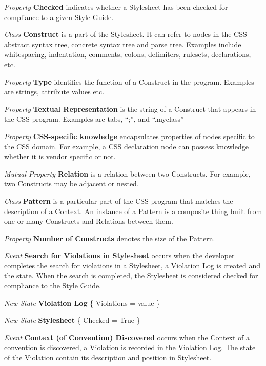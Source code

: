 \documentclass[parskip=full]{uvamscse}
\begin{document}
\begin{description}
\textit{Property} \textbf{Checked} indicates whether a Stylesheet has been checked for compliance to a given Style Guide. 


\item\textit{Class} \textbf{Construct} is a part of the Stylesheet. It can refer to nodes in the CSS abstract syntax tree, concrete syntax tree and parse tree. Examples include whitespacing, indentation, comments, colons, delimiters, rulesets, declarations, etc.

\textit{Property} \textbf{Type} identifies the function of a Construct in the program. Examples are strings, attribute values etc.

\textit{Property} \textbf{Textual Representation} is the string of a Construct that appears in the CSS program. Examples are tabs, ``;'', and ``.myclass''

\textit{Property} \textbf{CSS-specific knowledge} encapsulates properties of nodes specific to the CSS domain. For example, a CSS declaration node can possess knowledge whether it is vendor specific or not.

\textit{Mutual Property} \textbf{Relation} is a relation between two Constructs. For example, two Constructs may be adjacent or nested.


\item\textit{Class} \textbf{Pattern} is a particular part of the CSS program that matches the description of a Context. An instance of a Pattern is a composite thing built from one or many Constructs and Relations between them.

\textit{Property} \textbf{Number of Constructs} denotes the size of the Pattern.


\item\textit{Event} \textbf{Search for Violations in Stylesheet} occurs when the developer completes the search for violations in a Stylesheet, a Violation Log is created and the state. When the search is completed, the Stylesheet is considered checked for compliance to the Style Guide.

\textit{New State} \textbf{Violation Log} \{ Violations = value \}

\textit{New State} \textbf{Stylesheet} \{ Checked = True \}


\item\textit{Event} \textbf{Context (of Convention) Discovered} occurs when the Context of a convention is discovered, a Violation is recorded in the Violation Log. The state of the Violation contain its description and position in Stylesheet.


\end{description}
\end{document}
